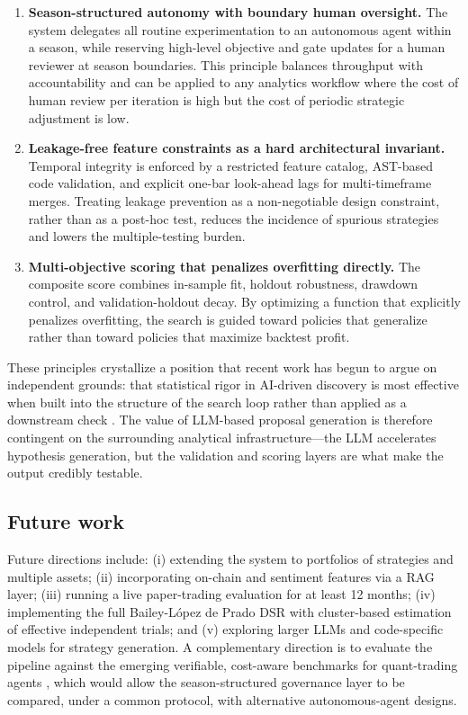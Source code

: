 \documentclass[analytics,article,submit,pdftex,moreauthors]{Definitions/mdpi}
\begin{document}
\begin{enumerate}
\def\labelenumi{\arabic{enumi}.}
\item
  \textbf{Season-structured autonomy with boundary human oversight.} The system delegates all routine experimentation to an autonomous agent within a season, while reserving high-level objective and gate updates for a human reviewer at season boundaries. This principle balances throughput with accountability and can be applied to any analytics workflow where the cost of human review per iteration is high but the cost of periodic strategic adjustment is low.
\item
  \textbf{Leakage-free feature constraints as a hard architectural invariant.} Temporal integrity is enforced by a restricted feature catalog, AST-based code validation, and explicit one-bar look-ahead lags for multi-timeframe merges. Treating leakage prevention as a non-negotiable design constraint, rather than as a post-hoc test, reduces the incidence of spurious strategies and lowers the multiple-testing burden.
\item
  \textbf{Multi-objective scoring that penalizes overfitting directly.} The composite score combines in-sample fit, holdout robustness, drawdown control, and validation-holdout decay. By optimizing a function that explicitly penalizes overfitting, the search is guided toward policies that generalize rather than toward policies that maximize backtest profit.
\end{enumerate}

These principles crystallize a position that recent work has begun to argue on independent grounds: that statistical rigor in AI-driven discovery is most effective when built into the structure of the search loop rather than applied as a downstream check \citep{benjamini_hochberg_1995}. The value of LLM-based proposal generation is therefore contingent on the surrounding analytical infrastructure---the LLM accelerates hypothesis generation, but the validation and scoring layers are what make the output credibly testable.

\subsection{Future work}\label{future-work}

Future directions include: (i) extending the system to portfolios of strategies and multiple assets; (ii) incorporating on-chain and sentiment features via a RAG layer; (iii) running a live paper-trading evaluation for at least 12 months; (iv) implementing the full Bailey-López de Prado DSR with cluster-based estimation of effective independent trials; and (v) exploring larger LLMs and code-specific models for strategy generation. A complementary direction is to evaluate the pipeline against the emerging verifiable, cost-aware benchmarks for quant-trading agents \citep{sun_2023_trademaster, sun_2023_prudex_compass}, which would allow the season-structured governance layer to be compared, under a common protocol, with alternative autonomous-agent designs.
\end{document}
